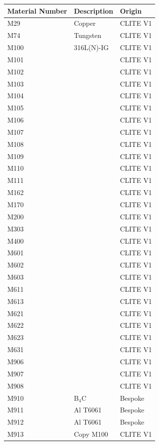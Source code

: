 \documentclass[12pt]{article}
\begin{document}
\begin{centering}
 \begin{longtable}[ht!]{ p{} | p{} | p{} }
  \hline 
  Material Number & Description & Origin \\
  \hline
  M29  & Copper &  CLITE V1 \\
  M74  & Tungsten &  CLITE V1 \\
  M100  & 316L(N)-IG &  CLITE V1 \\
  M101  & &  CLITE V1 \\
  M102  & &  CLITE V1 \\
  M103  & &  CLITE V1 \\
  M104  & &  CLITE V1 \\
  M105  & &  CLITE V1 \\
  M106  & &  CLITE V1 \\
  M107  & &  CLITE V1 \\
  M108  & &  CLITE V1 \\
  M109  & &  CLITE V1 \\
  M110  & &  CLITE V1 \\
  M111  & &  CLITE V1 \\
  M162  & &  CLITE V1 \\
  M170  & &  CLITE V1 \\
  M200  & &  CLITE V1 \\
  M303  & &  CLITE V1 \\
  M400  & &  CLITE V1 \\
  M601  & &  CLITE V1 \\
  M602  & &  CLITE V1 \\
  M603  & &  CLITE V1 \\
  M611  & &  CLITE V1 \\
  M613  & &  CLITE V1 \\
  M621  & &  CLITE V1 \\
  M622  & &  CLITE V1 \\
  M623  & &  CLITE V1 \\
  M631  & &  CLITE V1 \\
  M906  & &  CLITE V1 \\
  M907  & &  CLITE V1 \\
  M908  & &  CLITE V1 \\
  M910 & B$_4$C & Bespoke  \\
  M911 & Al T6061 & Bespoke  \\
  M912 & Al T6061 & Bespoke  \\
  M913 & Copy M100 & CLITE V1\\

\end{longtable}
\end{centering}
\end{document}
